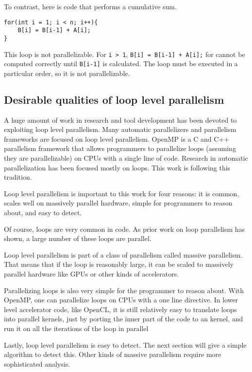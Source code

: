 \documentclass[12pt,twoside]{reedthesis}
\begin{document}
		To contrast, here is code that performs a cumulative sum. 
		
		\begin{lstlisting}
for(int i = 1; i < n; i++){
	B[i] = B[i-1] + A[i];
}
		\end{lstlisting}
		
		This loop is not parallelizable. For \texttt{i > 1}, \texttt{B[i] = B[i-1] + A[i];} for  cannot be computed correctly until \texttt{B[i-1]} is calculated. The loop must be executed in a particular order, so it is not parallelizable. 
		
		\subsection{Desirable qualities of loop level parallelism}
		
		A huge amount of work in research and tool development has been devoted to exploiting loop level parallelism. Many automatic parallelizers and parallelism frameworks are focused on loop level parallelism. OpenMP is a C and C++ parallelism framework that allows programmers to parallelize loops (assuming they are parallelizable) on CPUs with a single line of code. Research in automatic parallelization has been focused mostly on loops. This work is following this tradition. 
		
		Loop level parallelism is important to this work for four reasons: it is common, scales well on massively parallel hardware, simple for programmers to reason about, and easy to detect. 
		
		Of course, loops are very common in code. As prior work on loop parallelism has shown, a large number of these loops are parallel. 
		
		Loop level parallelism is part of a class of parallelism called massive parallelism. That means that if the loop is reasonably large, it can be scaled to massively parallel hardware like GPUs or other kinds of accelerators. 
		
		Parallelizing loops is also very simple for the programmer to reason about. With OpenMP, one can parallelize loops on CPUs with a one line directive. In lower level accelerator code, like OpenCL, it is still relatively easy to translate loops into parallel kernels, just by porting the inner part of the code to an kernel, and run it on all the iterations of the loop in parallel 
		
		Lastly, loop level parallelism is easy to detect. The next section will give a simple algorithm to detect this. Other kinds of massive parallelism require more sophisticated analysis. 
		
\end{document}
